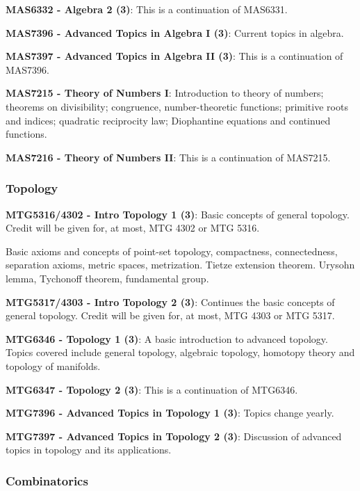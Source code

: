 \documentclass[11pt]{article}
\begin{document}
\textbf{MAS6332 - Algebra 2 (3)}: This is a continuation of MAS6331.

\textbf{MAS7396 - Advanced Topics in Algebra I (3)}: Current topics in algebra.

\textbf{MAS7397 - Advanced Topics in Algebra II (3)}: This is a continuation of MAS7396.

\textbf{MAS7215 - Theory of Numbers I}: Introduction to theory of numbers; theorems on divisibility; congruence, number-theoretic functions; primitive roots and indices; quadratic reciprocity law; Diophantine equations and continued functions.

\textbf{MAS7216 - Theory of Numbers II}: This is a continuation of MAS7215. 

\subsubsection{\colorbox{topo}{Topology}}

\textbf{MTG5316/4302 - Intro Topology 1 (3)}: Basic concepts of general topology. Credit will be given for, at most, MTG 4302 or MTG 5316.

Basic axioms and concepts of point-set topology, compactness, connectedness, separation axioms, metric spaces, metrization. Tietze extension theorem. Urysohn lemma, Tychonoff theorem, fundamental group.

\textbf{MTG5317/4303 - Intro Topology 2 (3)}: Continues the basic concepts of general topology. Credit will be given for, at most, MTG 4303 or MTG 5317.

\textbf{MTG6346 - Topology 1 (3)}: A basic introduction to advanced topology. Topics covered include general topology, algebraic topology, homotopy theory and topology of manifolds.

\textbf{MTG6347 - Topology 2 (3)}: This is a continuation of MTG6346.

\textbf{MTG7396 - Advanced Topics in Topology 1 (3)}: Topics change yearly.

\textbf{MTG7397 - Advanced Topics in Topology 2 (3)}: Discussion of advanced topics in topology and its applications.


\subsubsection{\colorbox{combi}{Combinatorics}}
\end{document}
